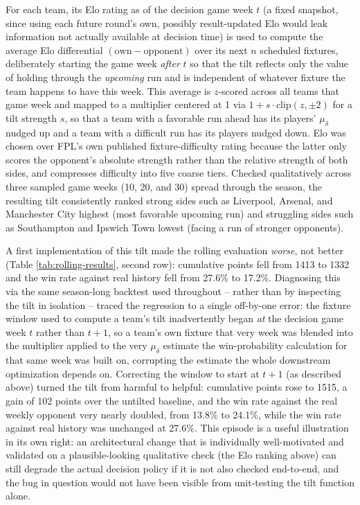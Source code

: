 			For each team, its Elo rating as of the decision game week $t$ (a fixed snapshot, since using each future round's own, possibly result-updated Elo would leak information not actually available at decision time) is used to compute the average Elo differential $(\text{own} - \text{opponent})$ over its next $n$ scheduled fixtures, deliberately starting the game week \emph{after} $t$ so that the tilt reflects only the value of holding through the \emph{upcoming} run and is independent of whatever fixture the team happens to have this week. This average is $z$-scored across all teams that game week and mapped to a multiplier centered at 1 via $1 + s\cdot\text{clip}(z,\pm2)$ for a tilt strength $s$, so that a team with a favorable run ahead has its players' $\mu_\delta$ nudged up and a team with a difficult run has its players nudged down. Elo was chosen over FPL's own published fixture-difficulty rating because the latter only scores the opponent's absolute strength rather than the relative strength of both sides, and compresses difficulty into five coarse tiers. Checked qualitatively across three sampled game weeks (10, 20, and 30) spread through the season, the resulting tilt consistently ranked strong sides such as Liverpool, Arsenal, and Manchester City highest (most favorable upcoming run) and struggling sides such as Southampton and Ipswich Town lowest (facing a run of stronger opponents).

			A first implementation of this tilt made the rolling evaluation \emph{worse}, not better (Table \ref{tab:rolling-results}, second row): cumulative points fell from 1413 to 1332 and the win rate against real history fell from 27.6\% to 17.2\%. Diagnosing this via the same season-long backtest used throughout -- rather than by inspecting the tilt in isolation -- traced the regression to a single off-by-one error: the fixture window used to compute a team's tilt inadvertently began \emph{at} the decision game week $t$ rather than $t+1$, so a team's own fixture that very week was blended into the multiplier applied to the very $\mu_\delta$ estimate the win-probability calculation for that same week was built on, corrupting the estimate the whole downstream optimization depends on. Correcting the window to start at $t+1$ (as described above) turned the tilt from harmful to helpful: cumulative points rose to 1515, a gain of 102 points over the untilted baseline, and the win rate against the real weekly opponent very nearly doubled, from 13.8\% to 24.1\%, while the win rate against real history was unchanged at 27.6\%. This episode is a useful illustration in its own right: an architectural change that is individually well-motivated and validated on a plausible-looking qualitative check (the Elo ranking above) can still degrade the actual decision policy if it is not also checked end-to-end, and the bug in question would not have been visible from unit-testing the tilt function alone.

